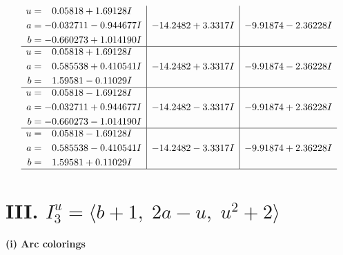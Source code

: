 \documentclass[1p]{elsarticle_modified}
\theoremstyle{definition}
\begin{document}
$$\begin{array}{c|c|c}
\begin{aligned}
u &= \phantom{-}0.05818 + 1.69128 I \\
a &= -0.032711 - 0.944677 I \\
b &= -0.660273 + 1.014190 I\end{aligned}
 & -14.2482 + 3.3317 I & -9.91874 - 2.36228 I \\ \hline\begin{aligned}
u &= \phantom{-}0.05818 + 1.69128 I \\
a &= \phantom{-}0.585538 + 0.410541 I \\
b &= \phantom{-}1.59581 - 0.11029 I\end{aligned}
 & -14.2482 + 3.3317 I & -9.91874 - 2.36228 I \\ \hline\begin{aligned}
u &= \phantom{-}0.05818 - 1.69128 I \\
a &= -0.032711 + 0.944677 I \\
b &= -0.660273 - 1.014190 I\end{aligned}
 & -14.2482 - 3.3317 I & -9.91874 + 2.36228 I \\ \hline\begin{aligned}
u &= \phantom{-}0.05818 - 1.69128 I \\
a &= \phantom{-}0.585538 - 0.410541 I \\
b &= \phantom{-}1.59581 + 0.11029 I\end{aligned}
 & -14.2482 - 3.3317 I & -9.91874 + 2.36228 I\\
 \hline 
 \end{array}$$\newpage\newpage\renewcommand{\arraystretch}{1}
\centering \section*{III. $I^u_{3}= \langle b+1,\;2 a- u,\;u^2+2 \rangle$}
\flushleft \textbf{(i) Arc colorings}\\
\end{document}
